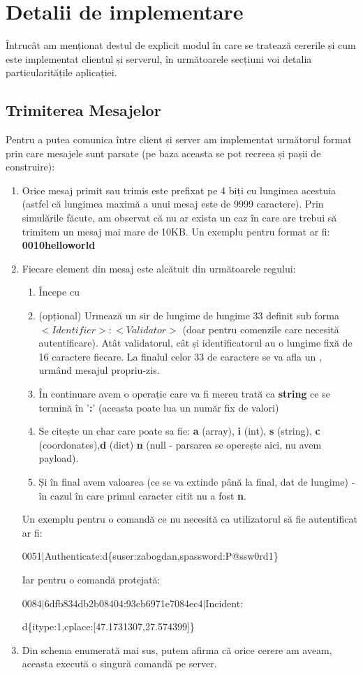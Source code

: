 \documentclass{article}
\begin{document}
\section{Detalii de implementare}
Întrucât am menționat destul de explicit modul în care se tratează cererile și cum este implementat clientul și serverul, în următoarele secțiuni voi detalia particularitățile aplicației.
\subsection{Trimiterea Mesajelor}
Pentru a putea comunica între client și server am implementat următorul format prin care mesajele sunt parsate (pe baza aceasta se pot recreea și pașii de construire):
\begin{enumerate}
    \item Orice mesaj primit sau trimis este prefixat pe 4 biți cu lungimea acestuia (astfel că lungimea maximă a unui mesaj este de 9999 caractere). Prin simulările făcute, am observat că nu ar exista un caz în care are trebui să trimitem un mesaj mai mare de 10KB. Un exemplu pentru format ar fi: \textbf{0010helloworld}
    \item Fiecare element din mesaj este alcătuit din următoarele regului: 
    \begin{enumerate}
        \item Începe cu \textbar 
        \item (opțional) Urmează un sir de lungime de lungime 33 definit sub forma \(<Identifier>:<Validator>\) (doar pentru comenzile care necesită autentificare). Atât validatorul, cât și identificatorul au o lungime fixă de 16 caractere fiecare. La finalul celor 33 de caractere se va afla un \textbar, urmând mesajul propriu-zis.
        \item În continuare avem o operație care va fi mereu trată ca \textbf{string} ce se termină în '\textbf{:}' (aceasta poate lua un număr fix de valori)
        \item Se citește un char care poate sa fie: \textbf{a} (array), \textbf{i} (int), \textbf{s} (string), \textbf{c} (coordonates),\textbf{d} (dict) \textbf{n} (null - parsarea se operește aici, nu avem payload).
        \item Și în final avem valoarea (ce se va extinde până la final, dat de lungime) - în cazul în care primul caracter citit nu a fost \textbf{n}.
    \end{enumerate}
    Un exemplu pentru o comandă ce nu necesită ca utilizatorul să fie autentificat ar fi: 
    
    0051\(\vert\)Authenticate:d\{suser:zabogdan,spassword:P@ssw0rd1\}

    Iar pentru o comandă protejată:

    0084\(\vert\)6dfb834db2b08404:93cb6971e7084ec4\(\vert\)Incident:

    d\{itype:1,cplace:[47.1731307,27.574399]\}

    \item Din schema enumerată mai sus, putem afirma că orice cerere am aveam, aceasta execută o singură comandă pe server.
\end{enumerate}
\end{document}
